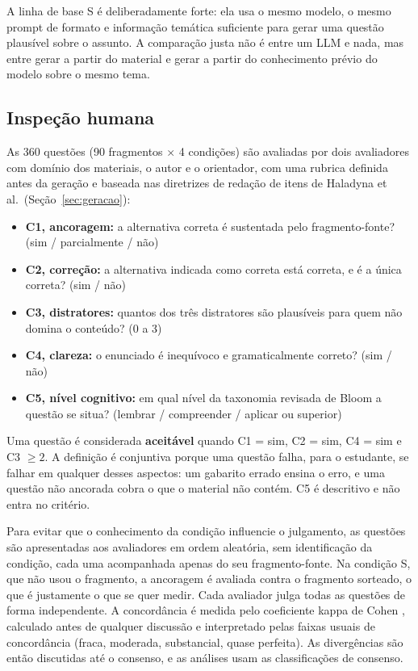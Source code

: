 A linha de base S é deliberadamente forte: ela usa o mesmo modelo, o mesmo prompt de formato e informação temática suficiente para gerar uma questão plausível sobre o assunto. A comparação justa não é entre um LLM e nada, mas entre gerar a partir do material e gerar a partir do conhecimento prévio do modelo sobre o mesmo tema.

\subsection{Inspeção humana}

As 360 questões (90 fragmentos $\times$ 4 condições) são avaliadas por dois avaliadores com domínio dos materiais, o autor e o orientador, com uma rubrica definida antes da geração e baseada nas diretrizes de redação de itens de Haladyna et al.\ (Seção~\ref{sec:geracao}):

\begin{itemize}
  \item \textbf{C1, ancoragem:} a alternativa correta é sustentada pelo fragmento-fonte? (sim / parcialmente / não)
  \item \textbf{C2, correção:} a alternativa indicada como correta está correta, e é a única correta? (sim / não)
  \item \textbf{C3, distratores:} quantos dos três distratores são plausíveis para quem não domina o conteúdo? (0 a 3)
  \item \textbf{C4, clareza:} o enunciado é inequívoco e gramaticalmente correto? (sim / não)
  \item \textbf{C5, nível cognitivo:} em qual nível da taxonomia revisada de Bloom \cite{AK01} a questão se situa? (lembrar / compreender / aplicar ou superior)
\end{itemize}

Uma questão é considerada \textbf{aceitável} quando C1 = sim, C2 = sim, C4 = sim e C3 $\ge 2$. A definição é conjuntiva porque uma questão falha, para o estudante, se falhar em qualquer desses aspectos: um gabarito errado ensina o erro, e uma questão não ancorada cobra o que o material não contém. C5 é descritivo e não entra no critério.

Para evitar que o conhecimento da condição influencie o julgamento, as questões são apresentadas aos avaliadores em ordem aleatória, sem identificação da condição, cada uma acompanhada apenas do seu fragmento-fonte. Na condição S, que não usou o fragmento, a ancoragem é avaliada contra o fragmento sorteado, o que é justamente o que se quer medir. Cada avaliador julga todas as questões de forma independente. A concordância é medida pelo coeficiente kappa de Cohen \cite{Coh60}, calculado antes de qualquer discussão e interpretado pelas faixas usuais de concordância (fraca, moderada, substancial, quase perfeita). As divergências são então discutidas até o consenso, e as análises usam as classificações de consenso.


